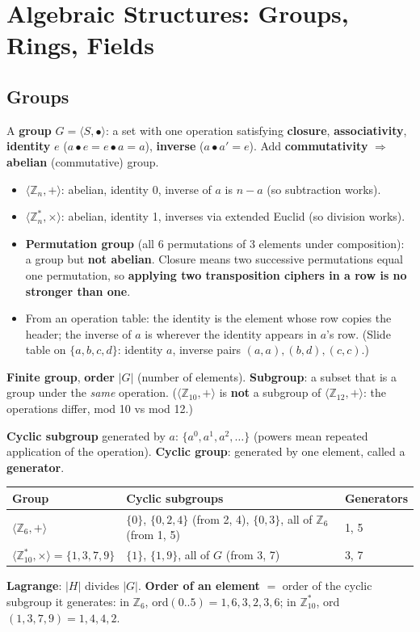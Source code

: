 \section{Algebraic Structures: Groups, Rings, Fields}\label{sec:algebra}

\subsection{Groups}
A \textbf{group} $G = \langle S, \bullet \rangle$: a set with one operation satisfying
\textbf{closure}, \textbf{associativity}, \textbf{identity} $e$ ($a \bullet e = e \bullet a = a$), \textbf{inverse} ($a \bullet a' = e$). Add \textbf{commutativity} $\Rightarrow$ \textbf{abelian} (commutative) group.
\begin{itemize}
  \item $\langle \mathbb{Z}_n, + \rangle$: abelian, identity 0, inverse of $a$ is $n - a$ (so subtraction works).
  \item $\langle \mathbb{Z}_n^*, \times \rangle$: abelian, identity 1, inverses via extended Euclid (so division works).
  \item \textbf{Permutation group} (all 6 permutations of 3 elements under composition): a group but \textbf{not abelian}. Closure means two successive permutations equal one permutation, so \textbf{applying two transposition ciphers in a row is no stronger than one}.
  \item From an operation table: the identity is the element whose row copies the header; the inverse of $a$ is wherever the identity appears in $a$'s row. (Slide table on $\{a,b,c,d\}$: identity $a$, inverse pairs $(a,a), (b,d), (c,c)$.)
\end{itemize}
\textbf{Finite group}, \textbf{order} $|G|$ (number of elements). \textbf{Subgroup}: a subset that is a group under the \emph{same} operation. ($\langle \mathbb{Z}_{10}, + \rangle$ is \textbf{not} a subgroup of $\langle \mathbb{Z}_{12}, + \rangle$: the operations differ, mod 10 vs mod 12.)

\textbf{Cyclic subgroup} generated by $a$: $\{a^0, a^1, a^2, \dots\}$ (powers mean repeated application of the operation). \textbf{Cyclic group}: generated by one element, called a \textbf{generator}.
\begin{center}\small
\begin{tabular}{@{}lll@{}}
\toprule
Group & Cyclic subgroups & Generators\\
\midrule
$\langle \mathbb{Z}_6, + \rangle$ & $\{0\}$, $\{0, 2, 4\}$ (from 2, 4), $\{0, 3\}$, all of $\mathbb{Z}_6$ (from 1, 5) & 1, 5\\
$\langle \mathbb{Z}_{10}^*, \times \rangle = \{1, 3, 7, 9\}$ & $\{1\}$, $\{1, 9\}$, all of $G$ (from 3, 7) & 3, 7\\
\bottomrule
\end{tabular}
\end{center}
\textbf{Lagrange}: $|H|$ divides $|G|$. \textbf{Order of an element} $=$ order of the cyclic subgroup it generates: in $\mathbb{Z}_6$, ord$(0..5) = 1, 6, 3, 2, 3, 6$; in $\mathbb{Z}_{10}^*$, ord$(1, 3, 7, 9) = 1, 4, 4, 2$.

